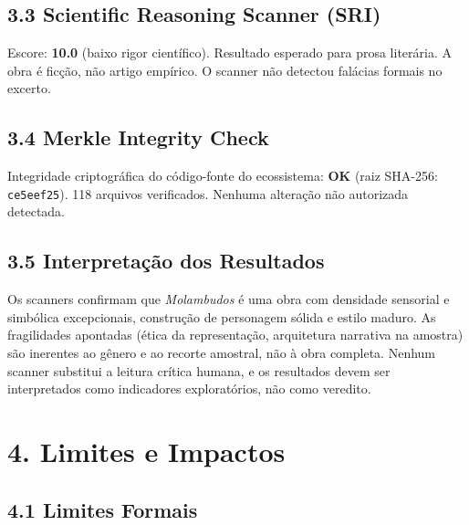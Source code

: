 \documentclass[14pt,openany]{extbook}
\begin{document}
\section*{3.3 Scientific Reasoning Scanner (SRI)}

Escore: \textbf{10.0} (baixo rigor científico). Resultado esperado para prosa literária. A obra é ficção, não artigo empírico. O scanner não detectou falácias formais no excerto.

\section*{3.4 Merkle Integrity Check}

Integridade criptográfica do código-fonte do ecossistema: \textbf{OK} (raiz SHA-256: \texttt{ce5eef25}). 118 arquivos verificados. Nenhuma alteração não autorizada detectada.

\section*{3.5 Interpretação dos Resultados}

Os scanners confirmam que \textit{Molambudos} é uma obra com densidade sensorial e simbólica excepcionais, construção de personagem sólida e estilo maduro. As fragilidades apontadas (ética da representação, arquitetura narrativa na amostra) são inerentes ao gênero e ao recorte amostral, não à obra completa. Nenhum scanner substitui a leitura crítica humana, e os resultados devem ser interpretados como indicadores exploratórios, não como veredito.

\chapter*{4. Limites e Impactos}

\section*{4.1 Limites Formais}
\end{document}
